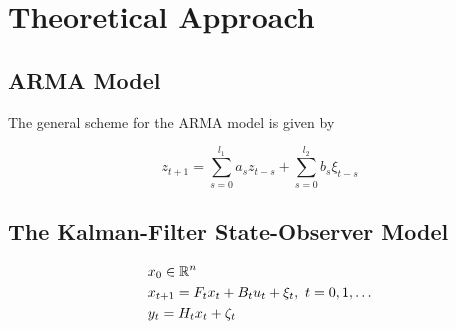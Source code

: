 \section{Theoretical Approach}\label{sec:theo}
\subsection{ARMA Model}
The general scheme for the ARMA model is given by

\begin{equation}
  z_{t+1}=\sum_{s=0}^{l_1}a_sz_{t-s}+\sum_{s=0}^{l_2}b_s\xi_{t-s}
\end{equation}

\subsection{The Kalman-Filter State-Observer Model}

\begin{equation}
  \begin{split}
    &x_0\in{\mathbb{R}}^n\\
    &x_{t+1}=F_tx_t + B_tu_t + \xi_t, \ t=0,1,\dots\\
    &y_t=H_tx_t+\zeta_t
  \end{split}
\end{equation}
